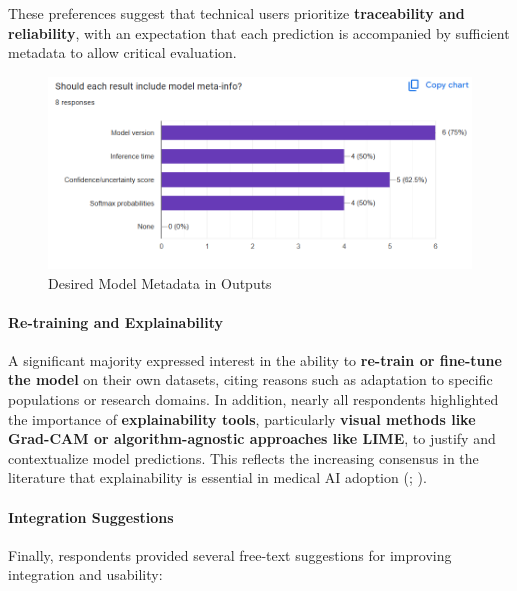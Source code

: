 \documentclass[
  12pt,
  oneside]{article}
\begin{document}
These preferences suggest that technical users prioritize
\textbf{traceability and reliability}, with an expectation that each
prediction is accompanied by sufficient metadata to allow critical
evaluation.

\begin{figure}

{\centering \includegraphics[width=1\linewidth]{technical-user-chart8} 

}

\caption{Desired Model Metadata in Outputs}\label{fig:unnamed-chunk-14}
\end{figure}

\paragraph{Re-training and
Explainability}\label{re-training-and-explainability}

A significant majority expressed interest in the ability to
\textbf{re-train or fine-tune the model} on their own datasets, citing
reasons such as adaptation to specific populations or research domains.
In addition, nearly all respondents highlighted the importance of
\textbf{explainability tools}, particularly \textbf{visual methods like
Grad-CAM or algorithm-agnostic approaches like LIME}, to justify and
contextualize model predictions. This reflects the increasing consensus
in the literature that explainability is essential in medical AI
adoption (;
).

\paragraph{Integration Suggestions}\label{integration-suggestions}

Finally, respondents provided several free-text suggestions for
improving integration and usability:
\end{document}
